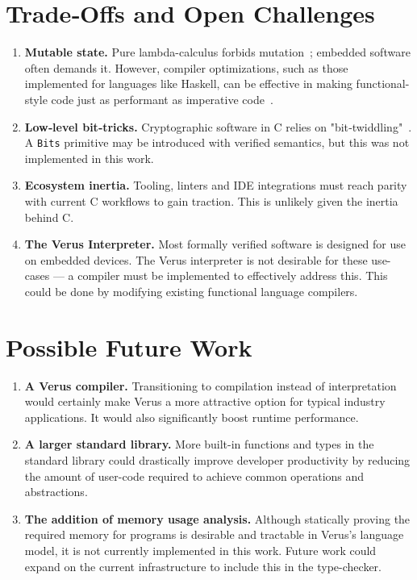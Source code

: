 \documentclass[conference]{IEEEtran}
\begin{document}
\section{Trade‑Offs and Open Challenges}
\begin{enumerate}[label=\roman*., nosep]
\item \textbf{Mutable state.}  Pure lambda-calculus forbids mutation~\cite{barendregt1984}; embedded software often demands it\cite{vahid2002}. However, compiler optimizations, such as those implemented for languages like Haskell, can be effective in making functional-style code just as performant as imperative code~\cite{burn1988}.
\item \textbf{Low‑level bit‑tricks.}  Cryptographic software in C relies on "bit‑twiddling"~\cite{warren2002}.  A \texttt{Bits} primitive may be introduced with verified semantics, but this was not implemented in this work.
\item \textbf{Ecosystem inertia.}  Tooling, linters and IDE integrations must reach parity with current C workflows to gain traction. This is unlikely given the inertia behind C.
\item \textbf{The Verus Interpreter.} Most formally verified software is designed for use on embedded devices. The Verus interpreter is not desirable for these use-cases --- a compiler must be implemented to effectively address this. This could be done by modifying existing functional language compilers.
\end{enumerate}

\section{Possible Future Work}
\begin{enumerate}[label=\arabic*., nosep]
\item \textbf{A Verus compiler.} Transitioning to compilation instead of interpretation would certainly make Verus a more attractive option for typical industry applications. It would also significantly boost runtime performance.
\item \textbf{A larger standard library.} More built-in functions and types in the standard library could drastically improve developer productivity by reducing the amount of user-code required to achieve common operations and abstractions.
\item \textbf{The addition of memory usage analysis.} Although statically proving the required memory for programs is desirable and tractable in Verus's language model, it is not currently implemented in this work. Future work could expand on the current infrastructure to include this in the type-checker.
\end{enumerate}
\end{document}
